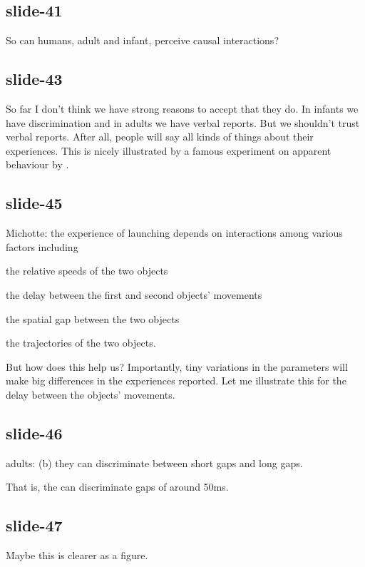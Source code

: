\documentclass[12pt,\papersize]{extarticle}
\begin{document}
\subsection{slide-41}
So can humans, adult and infant, perceive causal interactions?
 
\subsection{slide-43}
So far I don't think we have strong reasons to accept that they do.
In infants we have discrimination and in adults we have verbal reports.
But we shouldn't trust verbal reports.
After all, people will say all kinds of things about their experiences.
This is nicely illustrated by a famous experiment on apparent behaviour by \citet{Heider:1944ts}.
 
\subsection{slide-45}
Michotte: the experience of launching depends on interactions among various factors including 


            

              
the relative speeds of the two objects

              
the delay between the first and second objects’ movements

              
the spatial gap between the two objects 

              
the trajectories of the two objects. 

            
 
But how does this help us?  Importantly, tiny variations in the parameters will make 
big differences in the experiences reported.
Let me illustrate this for the delay between the objects' movements.
 
\subsection{slide-46}
adults: (b) they can discriminate between short gaps and long gaps.
 
That is, the can discriminate gaps of around 50ms.
 
\subsection{slide-47}
Maybe this is clearer as a figure.
 
\end{document}
